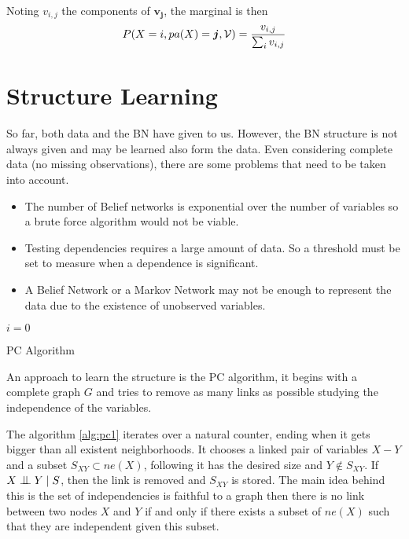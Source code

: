 Noting \(v_{i,j}\) the components of \(\bm{v_{j}}\), the marginal is then
\[
  P(X=i, pa(X) = \bm{j}, \mathcal{V}) = \frac{v_{i,j}}{\sum_{i}v_{i,j}}
\]

\section{Structure Learning}

So far, both data and the BN have given to us. However, the BN structure is not
always given and may be learned also form the data. Even considering complete
data (no missing observations), there are some problems that need to be taken
into account.
\begin{itemize}
    \item The number of Belief networks is exponential over the number of
    variables so a brute force algorithm would not be viable.
  \item Testing dependencies requires a large amount of data. So a threshold
    must be set to measure when a dependence is significant.
    \item A Belief Network or a Markov Network may not be enough to represent
    the data due to the existence of unobserved variables.
\end{itemize}


\begin{algorithm}[H]
  \SetAlgoLined
  \(i = 0\)\;
  \caption{PC Algorithm}
  \label{alg:pc1}
\end{algorithm}

An approach to learn the structure is the PC algorithm, it begins with a
complete graph \(G\) and tries to remove as many links as possible studying the
independence of the variables.

The algorithm \ref{alg:pc1} iterates over a natural counter, ending when it gets bigger
than all existent neighborhoods. It chooses a linked pair of variables \(X - Y\) and
a subset \(S_{XY} \subset ne(X)\), following it has the desired size and
\(Y \notin S_{XY}\). If \(X \bigCI Y \mid S\), then the link is removed and
\(S_{XY}\) is stored. The main idea behind this is the set of independencies is
faithful to a graph then there is no link between two nodes \(X\) and \(Y\) if
and only if there exists a subset of \(ne(X)\) such that they are independent
given this subset.

